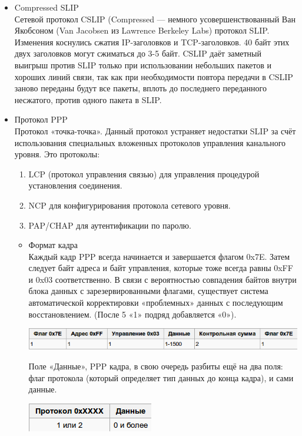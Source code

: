 \documentclass[12pt, russian, oneside, article]{ncc}
\begin{document}
\begin{itemize}
\item Compressed SLIP\\
\label{sec-5_2_11_2}%
Сетевой протокол CSLIP (Compressed — немного усовершенствованный Ван Якобсоном (Van Jacobsen из Lawrence Berkeley Labs) протокол SLIP. Изменения коснулись сжатия IP-заголовков и TCP-заголовков. 40 байт этих двух заголовков могут сжиматься до 3-5 байт. CSLIP даёт заметный выигрыш против SLIP только при использовании небольших пакетов и хороших линий связи, так как при необходимости повтора передачи в CSLIP заново переданы будут все пакеты, вплоть до последнего переданного несжатого, против одного пакета в SLIP.


\item Протокол PPP\\
\label{sec-5_2_11_3}%
Протокол «точка-точка». Данный протокол устраняет недостатки SLIP за счёт использования специальных вложенных протоколов управления канального уровня. Это протоколы:

\begin{enumerate}
\item LCP (протокол управления связью) для управления процедурой установления соединения.
\item NCP для конфигурирования протокола сетевого уровня.
\item PAP/CHAP для аутентификации по паролю.
\end{enumerate}

\begin{itemize}

\item Формат кадра\\
\label{sec-5_2_11_3_1}%
Каждый кадр PPP всегда начинается и завершается флагом 0x7E. Затем следует байт адреса и байт управления, которые тоже всегда равны 0xFF и 0x03 соответственно. В связи с вероятностью совпадения байтов внутри блока данных с зарезервированными флагами, существует система автоматической корректировки «проблемных» данных с последующим восстановлением. (После 5 «1» подряд добавляется «0»).

\includegraphics[]{images/SiSPI/pppframe.png}

Поле «Данные», PPP кадра, в свою очередь разбиты ещё на два поля: флаг протокола (который определяет тип данных до конца кадра), и сами данные.

\includegraphics[]{images/SiSPI/pppdata.png}


\end{itemize}
\end{itemize}
\end{document}
